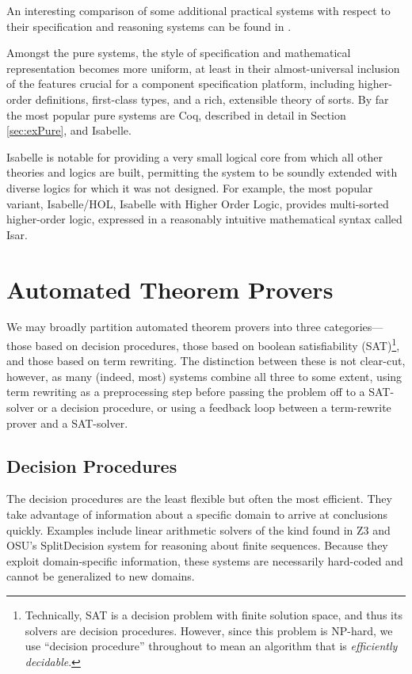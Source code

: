 An interesting comparison of some additional practical systems with respect to their specification and reasoning systems can be found in \cite{bisl}.

Amongst the pure systems, the style of specification and mathematical representation becomes more uniform, at least in their almost-universal inclusion of the features crucial for a component specification platform, including higher-order definitions, first-class types, and a rich, extensible theory of sorts.  By far the most popular pure systems are Coq, described in detail in Section \ref{sec:exPure}, and Isabelle.

Isabelle is notable for providing a very small logical core from which all other theories and logics are built, permitting the system to be soundly extended with diverse logics for which it was not designed.  For example, the most popular variant, Isabelle/HOL, Isabelle with Higher Order Logic, provides multi-sorted higher-order logic, expressed in a reasonably intuitive mathematical syntax called Isar\cite{wenzelIsar}.

\section{Automated Theorem Provers}\label{sec:overviewProvers}
We may broadly partition automated theorem provers into three categories---those based on decision procedures, those based on boolean satisfiability (SAT)\footnote{Technically, SAT is a decision problem with finite solution space, and thus its solvers are decision procedures.  However, since this problem is NP-hard, we use ``decision procedure'' throughout to mean an algorithm that is \emph{efficiently decidable}.}, and those based on term rewriting.  The distinction between these is not clear-cut, however, as many (indeed, most) systems combine all three to some extent, using term rewriting as a preprocessing step before passing the problem off to a SAT-solver or a decision procedure, or using a feedback loop between a term-rewrite prover and a SAT-solver.

\subsection{Decision Procedures} The decision procedures are the least flexible but often the most efficient.  They take advantage of information about a specific domain to arrive at conclusions quickly.  Examples include linear arithmetic solvers of the kind found in Z3\cite{deMouraZ3} and OSU's SplitDecision\cite{Sit11} system for reasoning about finite sequences.  Because they exploit domain-specific information, these systems are necessarily hard-coded and cannot be generalized to new domains.

